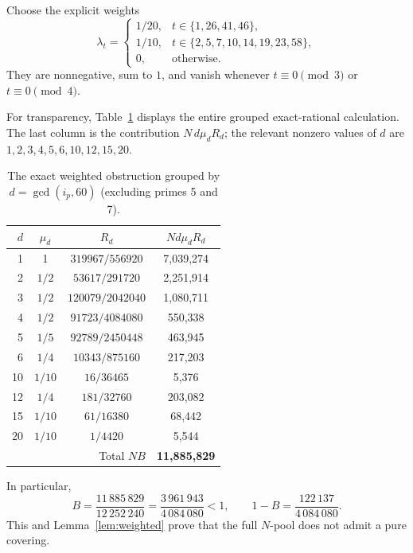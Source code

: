 \documentclass[11pt,a4paper]{article}
\begin{document}
Choose the explicit weights
\begin{equation}\label{eq:weights}
\lambda_t=\begin{cases}
  1/20,&t\in\{1,26,41,46\},\\
  1/10,&t\in\{2,5,7,10,14,19,23,58\},\\
  0,&\text{otherwise}.
\end{cases}
\end{equation}
They are nonnegative, sum to $1$, and vanish whenever $t\equiv0\pmod3$ or $t\equiv0\pmod4$.

For transparency, Table~\ref{tab:certificate} displays the entire grouped exact-rational calculation. The last column is the contribution $N\,d\mu_dR_d$; the relevant nonzero values of $d$ are $1,2,3,4,5,6,10,12,15,20$.

\begin{table}[htbp]
\centering\small
\caption{The exact weighted obstruction grouped by $d=\gcd(i_p,60)$ (excluding primes 5 and 7).}
\label{tab:certificate}
\begin{tabular}{@{}rccc@{}}\toprule
$d$ & $\mu_d$ & $R_d$ & $N d\mu_d R_d$ \\\midrule
1 & 1 & $319967/556920$ & 7,039,274 \\
2 & $1/2$ & $53617/291720$ & 2,251,914 \\
3 & $1/2$ & $120079/2042040$ & 1,080,711 \\
4 & $1/2$ & $91723/4084080$ & 550,338 \\
5 & $1/5$ & $92789/2450448$ & 463,945 \\
6 & $1/4$ & $10343/875160$ & 217,203 \\
10 & $1/10$ & $16/36465$ & 5,376 \\
12 & $1/4$ & $181/32760$ & 203,082 \\
15 & $1/10$ & $61/16380$ & 68,442 \\
20 & $1/10$ & $1/4420$ & 5,544 \\\midrule
\multicolumn{3}{r}{Total $NB$} & \textbf{11,885,829}\\
\bottomrule\end{tabular}
\end{table}

In particular,
\begin{equation}\label{eq:bound}
\boxed{B=\frac{11\,885\,829}{12\,252\,240}
=\frac{3\,961\,943}{4\,084\,080}<1,
\qquad 1-B=\frac{122\,137}{4\,084\,080}.}
\end{equation}
This and Lemma~\ref{lem:weighted} prove that the full $N$-pool does not admit a pure covering.
\end{document}
